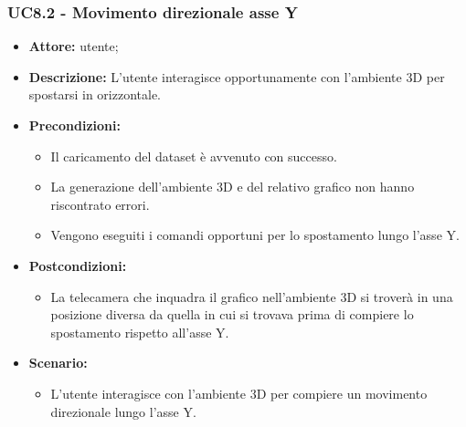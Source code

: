 \subsubsection{UC8.2 - Movimento direzionale asse Y}
\begin{itemize}    
    \item \textbf{Attore:} utente;
    \item \textbf{Descrizione:} L'utente interagisce opportunamente con l'ambiente 3D per spostarsi in orizzontale.
    \item \textbf{Precondizioni:}    
        \begin{itemize}
            \item Il caricamento del dataset è avvenuto con successo.
            \item La generazione dell'ambiente 3D e del relativo grafico non hanno riscontrato errori.
            \item Vengono eseguiti i comandi opportuni per lo spostamento lungo l'asse Y.
        \end{itemize}    
    \item \textbf{Postcondizioni:}
        \begin{itemize}
            \item La telecamera che inquadra il grafico nell'ambiente 3D si troverà in una posizione diversa da quella in cui si trovava prima di compiere lo spostamento rispetto all'asse Y.
        \end{itemize}    
    \item \textbf{Scenario:} 
        \begin{itemize}
            \item L'utente interagisce con l'ambiente 3D per compiere un movimento direzionale lungo l'asse Y.
        \end{itemize}
\end{itemize}
